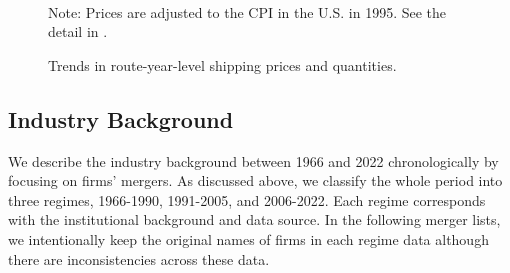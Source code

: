 \documentclass[10pt]{article}
\begin{document}
\begin{figure}[!ht]
\begin{center}
  \\
  \caption{Trends in route-year-level shipping prices and quantities.}
  \label{fg:container_freight_rate_and_shipping_quantity_each_route}
  \end{center}
\footnotesize
  Note: Prices are adjusted to the CPI in the U.S. in 1995. See the detail in \cite{matsuda2022unified}.
\end{figure}

\subsection{Industry Background}\label{sec:industry_background}
We describe the industry background between 1966 and 2022 chronologically by focusing on firms' mergers. 
As discussed above, we classify the whole period into three regimes, 1966-1990, 1991-2005, and 2006-2022. Each regime corresponds with the institutional background and data source.
In the following merger lists, we intentionally keep the original names of firms in each regime data although there are inconsistencies across these data.
\end{document}
